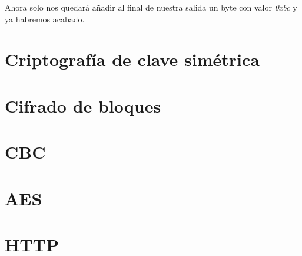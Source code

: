  Ahora solo nos quedará añadir al final de nuestra salida un byte con valor \emph{0xbc} y ya habremos acabado. \emph{\parencite{Reference17}}


 \section{Criptografía de clave simétrica}


 \section{Cifrado de bloques}


 \section{CBC}


 \section{AES}


 \section{HTTP}
